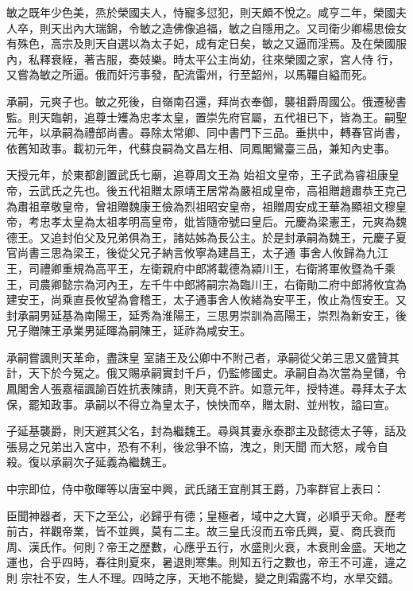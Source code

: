 \begin{pinyinscope}
 敏之既年少色美，烝於榮國夫人，恃寵多愆犯，則天頗不悅之。咸亨二年，榮國夫人卒，則天出內大瑞錦，令敏之造佛像追福，敏之自隱用之。又司衛少卿楊思儉女有殊色，高宗及則天自選以為太子妃，成有定日矣，敏之又逼而淫焉。及在榮國服內，私釋衰絰，著吉服，奏妓樂。時太平公主尚幼，往來榮國之家，宮人侍
 行，又嘗為敏之所逼。俄而奸污事發，配流雷州，行至韶州，以馬韁自縊而死。



 承嗣，元爽子也。敏之死後，自嶺南召還，拜尚衣奉御，襲祖爵周國公。俄遷秘書監。則天臨朝，追尊士矱為忠孝太皇，置崇先府官屬，五代祖已下，皆為王。嗣聖元年，以承嗣為禮部尚書。尋除太常卿、同中書門下三品。垂拱中，轉春官尚書，依舊知政事。載初元年，代蘇良嗣為文昌左相、同鳳閣鸞臺三品，兼知內史事。



 天授元年，於東都創置武氏七廟，追尊周文王為
 始祖文皇帝，王子武為睿祖康皇帝，云武氏之先也。後五代祖贈太原靖王居常為嚴祖成皇帝，高祖贈趙肅恭王克己為肅祖章敬皇帝，曾祖贈魏康王儉為烈祖昭安皇帝，祖贈周安成王華為顯祖文穆皇帝，考忠孝太皇為太祖孝明高皇帝，妣皆隨帝號曰皇后。元慶為梁憲王，元爽為魏德王。又追封伯父及兄弟俱為王，諸姑姊為長公主。於是封承嗣為魏王，元慶子夏官尚書三思為梁王，後從父兄子納言攸寧為建昌王，太子通
 事舍人攸歸為九江王，司禮卿重規為高平王，左衛親府中郎將載德為潁川王，右衛將軍攸暨為千乘王，司農卿懿宗為河內王，左千牛中郎將嗣宗為臨川王，右衛勛二府中郎將攸宜為建安王，尚乘直長攸望為會稽王，太子通事舍人攸緒為安平王，攸止為恆安王。又封承嗣男延基為南陽王，延秀為淮陽王，三思男崇訓為高陽王，崇烈為新安王，後兄子贈陳王承業男延暉為嗣陳王，延祚為咸安王。



 承嗣嘗諷則天革命，盡誅皇
 室諸王及公卿中不附己者，承嗣從父弟三思又盛贊其計，天下於今冤之。俄又賜承嗣實封千戶，仍監修國史。承嗣自為次當為皇儲，令鳳閣舍人張嘉福諷諭百姓抗表陳請，則天竟不許。如意元年，授特進。尋拜太子太保，罷知政事。承嗣以不得立為皇太子，怏怏而卒，贈太尉、並州牧，謚曰宣。



 子延基襲爵，則天避其父名，封為繼魏王。尋與其妻永泰郡主及懿德太子等，話及張易之兄弟出入宮中，恐有不利，後忿爭不協，洩之，則天聞
 而大怒，咸令自殺。復以承嗣次子延義為繼魏王。



 中宗即位，侍中敬暉等以唐室中興，武氏諸王宜削其王爵，乃率群官上表曰：



 臣聞神器者，天下之至公，必歸乎有德；皇極者，域中之大寶，必順乎天命。歷考前古，祥觀帝業，皆不並興，莫有二主。故三皇氏沒而五帝氏興，夏、商氏衰而周、漢氏作。何則？帝王之歷數，心應乎五行，水盛則火衰，木衰則金盛。天地之運也，合乎四時，春往則夏來，暑退則寒集。則知五行之數也，帝王不可違，違之則
 宗社不安，生人不理。四時之序，天地不能變，變之則霜露不均，水旱交錯。




\end{pinyinscope}

